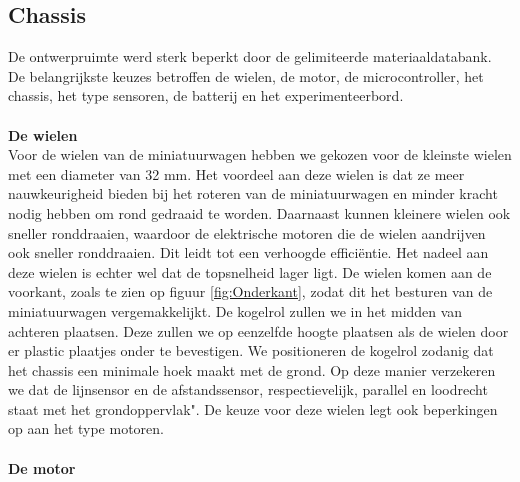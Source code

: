 \documentclass[a4paper,kulak]{kulakarticle}
\begin{document}
\subsection{Chassis}
De ontwerpruimte werd sterk beperkt door de gelimiteerde materiaaldatabank. De belangrijkste keuzes betroffen de wielen, de motor, de microcontroller, het chassis, het type sensoren, de batterij en het experimenteerbord.
\\\\ \textbf{\large De wielen} \\
Voor de wielen van de miniatuurwagen hebben we gekozen voor de kleinste wielen met een diameter van 32 mm. Het voordeel aan deze wielen is dat ze meer nauwkeurigheid bieden bij het roteren van de miniatuurwagen en minder kracht nodig hebben om rond gedraaid te worden. Daarnaast kunnen kleinere wielen ook sneller ronddraaien, waardoor de elektrische motoren die de wielen aandrijven ook sneller ronddraaien. Dit leidt tot een verhoogde efficiëntie. Het nadeel aan deze wielen is echter wel dat de topsnelheid lager ligt. De wielen komen aan de voorkant, zoals te zien op figuur \ref{fig:Onderkant}, zodat dit het besturen van de miniatuurwagen vergemakkelijkt. De kogelrol zullen we in het midden van achteren plaatsen. Deze zullen we op eenzelfde hoogte plaatsen als de wielen door er plastic plaatjes onder te bevestigen. We positioneren de kogelrol zodanig dat het chassis een minimale hoek maakt met de grond. Op deze manier verzekeren we dat de lijnsensor en de afstandssensor, respectievelijk, parallel en loodrecht staat met het grondoppervlak". De keuze voor deze wielen legt ook beperkingen op aan het type motoren.
\\\\ \textbf{\large De motor}
\end{document}
